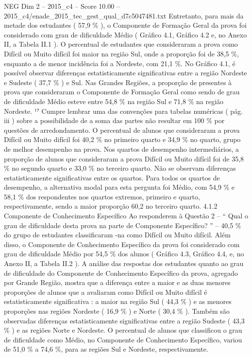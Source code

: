 \begin{textsample}{NEG Dim 2 – 2015\_c4 – Score 10.00 – 2015\_c4/enade\_2015\_tec\_gest\_qual\_d7c5047481.txt}
Entretanto, para mais da metade dos estudantes ( 57,9 \% ), o Componente de Formação Geral da prova foi considerado com grau de dificuldade Médio ( Gráfico 4.1, Gráfico 4.2 e, no Anexo II, a Tabela II.1 ).
O percentual de estudantes que consideraram a prova como Difícil ou Muito difícil foi maior na região Sul, onde a proporção foi de 38,5 \%, enquanto a de menor incidência foi a Nordeste, com 21,1 \%.
No Gráfico 4.1, é possível observar diferenças estatisticamente significativas entre a região Nordeste e Sudeste ( 37,7 \% ) e Sul.
Nas Grandes Regiões, a proporção de presentes à prova que consideraram o Componente de Formação Geral como sendo de grau de dificuldade Médio esteve entre 54,8 \% na região Sul e 71,8 \% na região Nordeste. ¹⁷ Cumpre lembrar uma das convenções para tabelas numéricas ( pág. iii ) sobre a possibilidade de a soma das partes não resultar em 100 \% por questões de arredondamento.
O percentual de alunos que consideraram a prova Difícil ou Muito difícil foi 40,2 \% no primeiro quarto e 34,9 \% no quarto, grupo de melhor desempenho na prova.
Nos quartos de desempenho intermediários, a proporção de alunos que consideraram a prova Difícil ou Muito difícil foi de 35,8 \% no segundo quarto e 33,0 \% no terceiro quarto.
Não se observam diferenças estatisticamente significativas entre os quartos.
Para todos os quartos de desempenho, a alternativa modal para esta pergunta foi Médio, com 54,9 \% e 58,1 \% dos respondentes nos quartos extremos, primeiro e quarto, respectivamente, sendo a maior proporção 60,2 no terceiro quarto. 4.1.2 Componente de Conhecimento Específico Ao responderem à Questão 2 – “ Qual o grau de dificuldade desta prova na parte de Componente Específico? ” – 40,5 \% do grupo de estudantes classificaram -na como Difícil ou Muito difícil.
Além disso, o Componente de Conhecimento Específico da prova foi considerado com grau de dificuldade Médio por 54,5 \% dos alunos ( Gráfico 4.3, Gráfico 4.4, e, no Anexo II, a Tabela II.2 ).
A análise das respostas dos estudantes quanto ao grau de dificuldade do Componente de Conhecimento Específico da prova, agregado por Grande Região, mostra que a diferença entre a maior e as duas menores proporções de alunos que a avaliaram como Difícil ou Muito difícil é estatisticamente significativa : a maior na região Sul ( 44,3 \% ) e as menores proporções nas regiões Nordeste ( 16,9 \% ) e Norte ( 30,4 \% ).
Também são observadas diferenças estatisticamente significativas entre a região Sudeste ( 43,3 \% ) e as regiões Norte e Nordeste.
O percentual de alunos que classificou o grau de dificuldade como Médio, no Componente de Conhecimento Específico, variou de 51,0 \% a 74,6 \%, para as regiões Sul e Nordeste, respectivamente.

\end{textsample}
